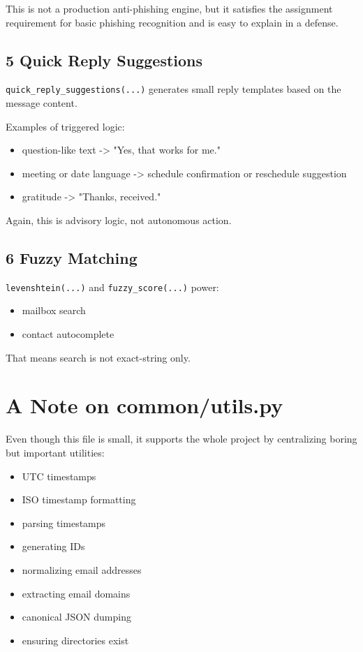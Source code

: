 \documentclass[11pt,a4paper]{article}
\begin{document}
This is not a production anti-phishing engine, but it satisfies the assignment requirement for basic phishing recognition and is easy to explain in a defense.

\subsection{5 Quick Reply Suggestions}

\nolinkurl{quick_reply_suggestions(...)} generates small reply templates based on the message content.

Examples of triggered logic:

\begin{itemize}
\item question-like text -> "Yes, that works for me."
\item meeting or date language -> schedule confirmation or reschedule suggestion
\item gratitude -> "Thanks, received."
\end{itemize}

Again, this is advisory logic, not autonomous action.

\subsection{6 Fuzzy Matching}

\nolinkurl{levenshtein(...)} and \nolinkurl{fuzzy_score(...)} power:

\begin{itemize}
\item mailbox search
\item contact autocomplete
\end{itemize}

That means search is not exact-string only.


\section{A Note on common/utils.py}

Even though this file is small, it supports the whole project by centralizing boring but important utilities:

\begin{itemize}
\item UTC timestamps
\item ISO timestamp formatting
\item parsing timestamps
\item generating IDs
\item normalizing email addresses
\item extracting email domains
\item canonical JSON dumping
\item ensuring directories exist
\end{itemize}
\end{document}
